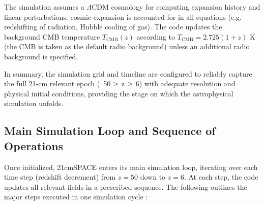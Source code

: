 \documentclass[floats,floatfix,showpacs,amssymb,prd,superscriptaddress,nofootinbib]{revtex4-2} %
\newcommand{\gt}{\ensuremath >}
\begin{document}
The simulation assumes a $\Lambda$CDM cosmology for computing expansion history and linear perturbations. cosmic expansion is accounted for in all equations (e.g. redshifting of radiation, Hubble cooling of gas). The code updates the background CMB temperature $T_{\text{CMB}}(z)$ according to $T_{\text{CMB}} = 2.725(1+z)$ K (the CMB is taken as the default radio background) unless an additional radio background is specified.

In summary, the simulation grid and timeline are configured to reliably capture the full 21-cm relevant epoch (~50 $\gt$ z $\gt$ 6) with adequate resolution and physical initial conditions, providing the stage on which the astrophysical simulation unfolds.

\subsection{Main Simulation Loop and Sequence of Operations}

Once initialized, 21cmSPACE enters its main simulation loop, iterating over each time step (redshift decrement) from $z=50$ down to $z=6$. At each step, the code updates all relevant fields in a prescribed sequence. The following outlines the major steps executed in one simulation cycle \citep{gessey-jones_2024}:
\end{document}
